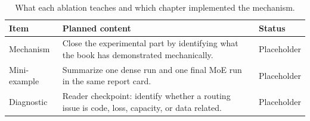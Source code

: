 \begin{table}[H]
\centering
\caption{What each ablation teaches and which chapter implemented the mechanism.}
\label{tab:ch11-chapter-summary-and-handoff}
\begin{tabularx}{\textwidth}{p{}X p{}}
\toprule
Item & Planned content & Status \\
\midrule
Mechanism & Close the experimental part by identifying what the book has demonstrated mechanically. & Placeholder \\
Mini-example & Summarize one dense run and one final MoE run in the same report card. & Placeholder \\
Diagnostic & Reader checkpoint: identify whether a routing issue is code, loss, capacity, or data related. & Placeholder \\
\bottomrule
\end{tabularx}
\end{table}
